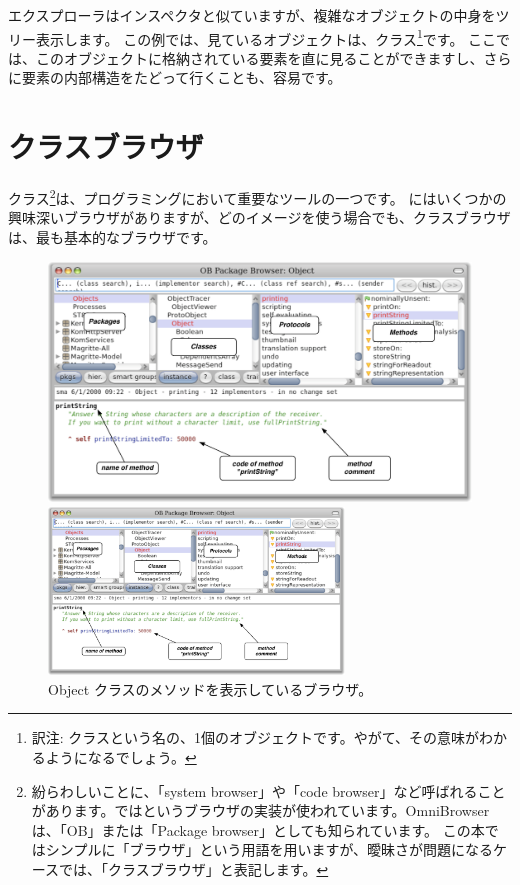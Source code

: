 \documentclass[a4paper,10pt,twoside]{book}
\begin{document}
エクスプローラはインスペクタと似ていますが、複雑なオブジェクトの中身をツリー表示します。
この例では、見ているオブジェクトは、クラス\footnote{訳注: クラスという名の、1個のオブジェクトです。やがて、その意味がわかるようになるでしょう。}です。
ここでは、このオブジェクトに格納されている要素を直に見ることができますし、さらに要素の内部構造をたどって行くことも、容易です。

\section{クラスブラウザ}

クラス\footnote{紛らわしいことに、「system browser」や「code browser」など呼ばれることがあります。\pharo ではというブラウザの実装が使われています。OmniBrowserは、「OB」または「Package browser」としても知られています。
この本ではシンプルに「ブラウザ」という用語を用いますが、曖昧さが問題になるケースでは、「クラスブラウザ」と表記します。}は、プログラミングにおいて重要なツールの一つです。
\pharo にはいくつかの興味深いブラウザがありますが、どのイメージを使う場合でも、クラスブラウザは、最も基本的なブラウザです。


\begin{figure}[htb]
\ifluluelse
	{\centerline {\includegraphics[width=\textwidth]{ClassBrowser1}}}
	{\centerline {\includegraphics[width=0.7\textwidth]{ClassBrowser1}}}
\caption{Object クラスのメソッドを表示しているブラウザ。
}
\end{figure}
\end{document}
